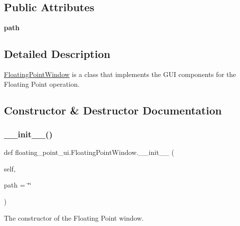 \subsection*{Public Attributes}
\begin{DoxyCompactItemize}
\item 
\mbox{\label{classfloating__point__ui_1_1_floating_point_window_aa40210a7ef669d041d3f4ea1880a4047}} 
{\bfseries path}
\end{DoxyCompactItemize}


\subsection{Detailed Description}
\hyperlink{classfloating__point__ui_1_1_floating_point_window}{Floating\+Point\+Window} is a class that implements the G\+UI components for the Floating Point operation. 

\subsection{Constructor \& Destructor Documentation}
\mbox{\label{classfloating__point__ui_1_1_floating_point_window_ab5a1e532591e07c6ad7603c561532979}} 
\subsubsection{\texorpdfstring{\+\_\+\+\_\+init\+\_\+\+\_\+()}{\_\_init\_\_()}}
{\footnotesize\ttfamily def floating\+\_\+point\+\_\+ui.\+Floating\+Point\+Window.\+\_\+\+\_\+init\+\_\+\+\_\+ (\begin{DoxyParamCaption}\item[{}]{self,  }\item[{}]{path = {\ttfamily \char`\"{}\char`\"{}} }\end{DoxyParamCaption})}



The constructor of the Floating Point window. 


